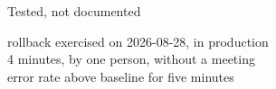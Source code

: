 
\begin{frame}{Tested, not documented}
  \begin{console}
       rollback exercised on 2026-08-28, in production\\
      4 minutes, by one person, without a meeting\\
   error rate above baseline for five minutes
  \end{console}
\end{frame}
